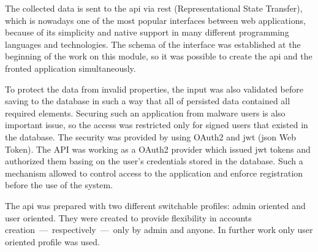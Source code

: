 The collected data is sent to the \gls{api} via \gls{rest} (Representational State Transfer), which is nowadays one of the most popular interfaces between web applications, because of its simplicity and native support in many different programming languages and technologies.
The schema of the interface was established at the beginning of the work on this module, so it was possible to create the \gls{api} and the fronted application simultaneously.

To protect the data from invalid properties, the input was also validated before saving to the database in such a way that all of persisted data contained all required elements.
Securing such an application from malware users is also important issue, so the access was restricted only for signed users that existed in the database.
The security was provided by using OAuth2 and \gls{jwt} (\gls{json} Web Token).
The API was working as a OAuth2 provider which issued \gls{jwt} tokens and authorized them basing on the user's credentials stored in the database.
Such a mechanism allowed to control access to the application and enforce registration before the use of the system.

The \gls{api} was prepared with two different switchable profiles: admin oriented and user oriented.
They were created to provide flexibility in accounts creation~---~respectively~---~only by admin and anyone.
In further work only user oriented profile was used.